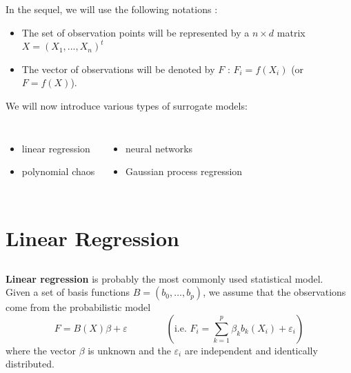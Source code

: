 \documentclass{beamer}
\begin{document}
\begin{frame}{}
In the sequel, we will use the following notations : 
\begin{itemize}
	\item The set of observation points will be represented by a $n \times d$ matrix $X=(X_1, ..., X_n)^t$
	\item The vector of observations will be denoted by $F$ : $F_i=f(X_i)$ (or $F=f(X)$).
\end{itemize}
\vspace{5mm}
We will now introduce various types of surrogate models:
\begin{columns}[t]
\column{5cm}
\begin{itemize}
	\item linear regression
	\item polynomial chaos
\end{itemize}
\column{5cm}
\begin{itemize}
	\item neural networks
	\item Gaussian process regression
\end{itemize}
\end{columns}
\end{frame}

\section{Linear Regression}
\subsection{}

\begin{frame}{}
\textbf{Linear regression} is probably the most commonly used statistical model.\\ \vspace{3mm}
Given a set of basis functions $B=(b_0, \dots, b_p)$, we assume that the observations come from the probabilistic model
$$ F = B(X) \beta  + \varepsilon \qquad \qquad \left( \text{i.e. } F_i = \sum_{k=1}^p \beta_k b_k(X_i) + \varepsilon_i \right) $$
where the vector $\beta$ is unknown and the $\varepsilon_i$ are independent and identically distributed.
\end{frame}
\end{document}
